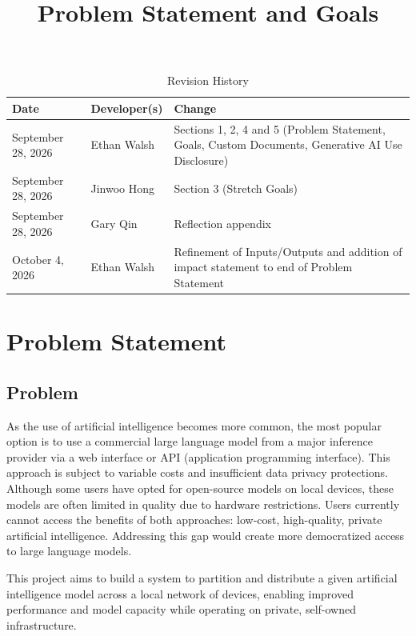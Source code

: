 \documentclass{article}
\title{Problem Statement and Goals\\\progname}
\author{\authname}
\date{}
\begin{document}
\maketitle

\begin{table}[hp]
\caption{Revision History} \label{TblRevisionHistory}
\begin{tabularx}{\textwidth}{llX}
\toprule
\textbf{Date} & \textbf{Developer(s)} & \textbf{Change}\\
\midrule
September 28, 2026 & Ethan Walsh & Sections 1, 2, 4 and 5 (Problem
  Statement, Goals, Custom Documents, Generative AI Use Disclosure)\\
September 28, 2026 & Jinwoo Hong & Section 3 (Stretch Goals)\\
September 28, 2026 & Gary Qin & Reflection appendix\\
October 4, 2026 & Ethan Walsh & Refinement of Inputs/Outputs and addition of impact statement to end of Problem Statement\\
\bottomrule
\end{tabularx}
\end{table}

\section{Problem Statement}

\subsection{Problem}

As the use of artificial intelligence becomes more common, the most 
popular option is to use a commercial large language model from a major inference 
provider via a web interface or API (application programming interface). This approach is subject to variable costs 
and insufficient data privacy protections. Although some users have opted for 
open-source models on local devices, these models are often limited in quality 
due to hardware restrictions. Users currently cannot access the benefits of 
both approaches: low-cost, high-quality, private artificial intelligence. 
Addressing this gap would create more democratized access to large language models. 

This project aims to build a system to partition and distribute a given artificial intelligence model across a local network of devices, enabling 
improved performance and model capacity while operating on private, self-owned infrastructure.
\end{document}

